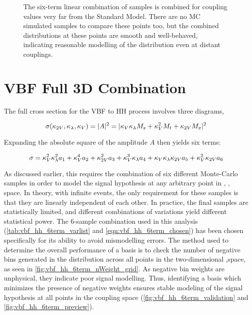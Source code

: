    \begin{figure}
    	\centering
        \caption{
            The six-term linear combination of samples is combined for coupling values very far from the Standard Model.
            There are no MC simulated samples to compare these points too, but the combined distributions at these points are smooth and well-behaved,
                indicating reasonable modelling of the distribution even at distant couplings.
        }
        \label{fig:vbf_hh_preview}
    \end{figure}


\section{VBF Full 3D Combination} \label{app:vbf3dcombination}

    The full cross section for the VBF to HH process involves three diagrams,

    \begin{equation}
    \label{eqn:vbf_hh_6term_amp}
    \sigma(\kappa_{2V}, \kappa_{\lambda}, \kappa_{V}) = |A|^2 = | \kappa_{V} \kappa_{\lambda} M_s + \kappa_{V}^2 M_t + \kappa_{2V} M_x |^2
    \end{equation}

    Expanding the absolute square of the amplitude $A$ then yields six terms:

    \begin{equation}
    \label{eqn:vbf_hh_6term_generic}
    \sigma = \kappa_{V}^2 \kappa_{\lambda}^2 a_1 + \kappa_{V}^4 a_2 + \kappa_{2V}^2 a_3 + \kappa_{V}^3 \kappa_{\lambda} a_4 + \kappa_{V} \kappa_{\lambda} \kappa_{2V} a_5 + \kappa_{V}^2 \kappa_{2V} a_6
    \end{equation}

    As discussed earlier, this requires the combination of six different Monte-Carlo samples in order to model the signal hypothesis at any arbitrary point in \kvv, \kl, \kv space.
    In theory, with infinite events, the only requirement for these samples is that they are linearly independent of each other.
    In practice, the final samples are statistically limited, and different combinations of variations yield different statistical power.
    The 6-sample combination used in this analysis (\ref{tab:vbf_hh_6term_varlist} and \ref{eqn:vbf_hh_6term_chosen}) has been chosen specifically for its ability to avoid mismodelling errors.
    The method used to determine the overall performance of a basis is to check the number of negative bins generated
        in the \mhh distribution across all points in the two-dimensional \kvv,\kl space, as seen in \ref{fig:vbf_hh_6term_nWeight_grid}.
    As negative bin weights are unphysical, they indicate poor signal modelling.
    Thus, identifying a basis which minimizes the presence of negative weights ensures stable modeling of the signal hypothesis at all points in the coupling space (\ref{fig:vbf_hh_6term_validation} and \ref{fig:vbf_hh_6term_preview}).

